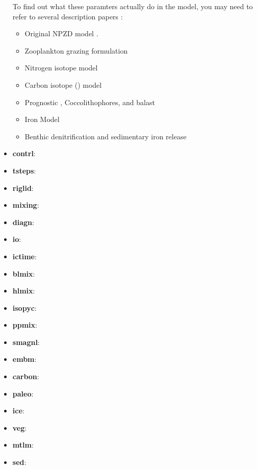 \documentclass[a4paper]{article}
\def\noin{\noindent }
\begin{document}
\begin{itemize}
\noin To find out what these paramters actually do in the model, you may need to refer to several description papers :
\begin{itemize}
\item Original NPZD model \citep{Oschlies99, Giraud00,Schmittner05,Schmittner08}. 
\item Zooplankton grazing formulation \citep{Keller12}
\item Nitrogen isotope model \citep{Somes10grl,Somes10gbc,Somes13}
\item Carbon isotope () model \citep{Schmittner13}
\item Prognostic , Coccolithophores, and balast \citep{Kvale15}
\item Iron Model \citep{Nickelsen15}
\item Benthic denitrification and sedimentary iron release \citep{Somes15,Muglia17}
\end{itemize}

\item \textbf{contrl}:
\item \textbf{tsteps}:
\item \textbf{riglid}:
\item \textbf{mixing}:
\item \textbf{diagn}:
\item \textbf{io}:
\item \textbf{ictime}:
\item \textbf{blmix}:
\item \textbf{hlmix}:
\item \textbf{isopyc}:
\item \textbf{ppmix}:
\item \textbf{smagnl}:
\item \textbf{embm}:
\item \textbf{carbon}:
\item \textbf{paleo}:
\item \textbf{ice}:
\item \textbf{veg}:
\item \textbf{mtlm}:
\item \textbf{sed}:

\end{itemize}




\clearpage
 

\end{document}
